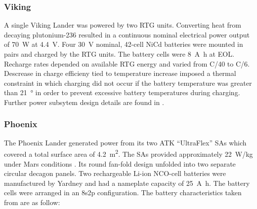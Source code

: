 \subsubsection{Viking}

A single Viking Lander was powered by two \ac{RTG} units. Converting heat from decaying plutonium-236 resulted in a continuous nominal electrical power output of \SI{70}{\watt} at \SI{4.4}{\volt}. Four \SI{30}{\volt} nominal, 42-cell \ac{NiCd} batteries were mounted in pairs and charged by the \ac{RTG} units. The battery cells were \SI{8}{\ampere\hour} at \ac{EOL}. Recharge rates depended on available \ac{RTG} energy and varied from C/40 to C/6. Descrease in charge efficieny tied to temperature increase imposed a thermal constraint in which charging did not occur if the battery temperature was greater than \SI{21}{\degree} in order to prevent excessive battery temperatures during charging. Further power subsytem design details are found in .


\subsubsection{Phoenix}

The Phoenix Lander generated power from its two ATK ``UltraFlex'' \acp{SA} which covered a total surface area of \SI{4.2}{\meter\squared}. The \acp{SA} provided approximately \SI{22}{\watt/\kilo\gram} under Mars conditions  . Its round fan-fold design unfolded into two separate circular decagon panels. Two rechargeable \ac{Li-ion} \ac{NCO}-cell batteries were manufactured by Yardney and had a nameplate capacity of \SI{25}{\ampere\hour}. The battery cells were arranged in an 8s2p configuration. The battery characteristics taken from  are as follow:

